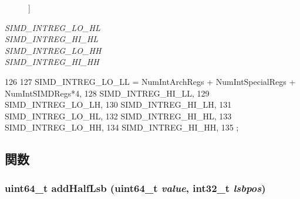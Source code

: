 \begin{Desc}
\begin{description}
{}]\item[{\em 
\hypertarget{namespaceMipsISA_a05e4fcfbdafc2aca59e48af73c7f12eca646de05bcf6a124da8ef80cf70e19176}{
SIMD\_\-INTREG\_\-LO\_\-HL}
\label{namespaceMipsISA_a05e4fcfbdafc2aca59e48af73c7f12eca646de05bcf6a124da8ef80cf70e19176}
}]\item[{\em 
\hypertarget{namespaceMipsISA_a05e4fcfbdafc2aca59e48af73c7f12eca0b06ae619c82ecbcdd19075de12a5a5d}{
SIMD\_\-INTREG\_\-HI\_\-HL}
\label{namespaceMipsISA_a05e4fcfbdafc2aca59e48af73c7f12eca0b06ae619c82ecbcdd19075de12a5a5d}
}]\item[{\em 
\hypertarget{namespaceMipsISA_a05e4fcfbdafc2aca59e48af73c7f12eca9536486f8f579789069507950c88b7c3}{
SIMD\_\-INTREG\_\-LO\_\-HH}
\label{namespaceMipsISA_a05e4fcfbdafc2aca59e48af73c7f12eca9536486f8f579789069507950c88b7c3}
}]\item[{\em 
\hypertarget{namespaceMipsISA_a05e4fcfbdafc2aca59e48af73c7f12eca9cb0f33583f9adc323b378926c06e2de}{
SIMD\_\-INTREG\_\-HI\_\-HH}
\label{namespaceMipsISA_a05e4fcfbdafc2aca59e48af73c7f12eca9cb0f33583f9adc323b378926c06e2de}
}]\end{description}
\end{Desc}




\begin{DoxyCode}
126                         {
127   SIMD_INTREG_LO_LL = NumIntArchRegs + NumIntSpecialRegs + NumIntSIMDRegs*4,
128   SIMD_INTREG_HI_LL,
129   SIMD_INTREG_LO_LH,
130   SIMD_INTREG_HI_LH,
131   SIMD_INTREG_LO_HL,
132   SIMD_INTREG_HI_HL,
133   SIMD_INTREG_LO_HH,
134   SIMD_INTREG_HI_HH,
135 };
\end{DoxyCode}


\subsection{関数}
\hypertarget{namespaceMipsISA_a6ca3b5075cddff927b0b7870b8b73d5f}{
\subsubsection[{addHalfLsb}]{\setlength{\rightskip}{0pt plus 5cm}uint64\_\-t addHalfLsb (uint64\_\-t {\em value}, \/  int32\_\-t {\em lsbpos})}}
\label{namespaceMipsISA_a6ca3b5075cddff927b0b7870b8b73d5f}



